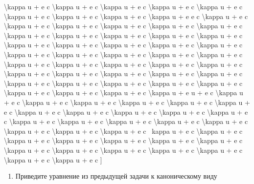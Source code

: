 \documentclass[
]{article}
\providecommand{\tightlist}{%
  \setlength{\itemsep}{0pt}\setlength{\parskip}{0pt}}
\begin{document}
{{\textbackslash kappa u + e c \textbackslash kappa u + e c
\textbackslash kappa u + e c \textbackslash kappa u + e c
\textbackslash kappa u + e c \textbackslash kappa u + e c
\textbackslash kappa u + e c \textbackslash kappa u + e c
\textbackslash kappa u + e e c \textbackslash kappa u + e c
\textbackslash kappa u + e c \textbackslash kappa u + e c
\textbackslash kappa u + e c \textbackslash kappa u + e c
\textbackslash kappa u + e c \textbackslash kappa u + e c
\textbackslash kappa u + e c \textbackslash kappa u + e c
\textbackslash kappa u + e c \textbackslash kappa u + e c
\textbackslash kappa u + e c \textbackslash kappa u + e c
\textbackslash kappa u + e c \textbackslash kappa u + e c
\textbackslash kappa u + e c \textbackslash kappa u + e c
\textbackslash kappa u + e c \textbackslash kappa u + e c
\textbackslash kappa u + e c \textbackslash kappa u + e c
\textbackslash kappa u + e c \textbackslash kappa u + e c
\textbackslash kappa u + e c \textbackslash kappa u + e c
\textbackslash kappa u + e c \textbackslash kappa u + e c
\textbackslash kappa u + e c \textbackslash kappa u + e c
\textbackslash kappa u + e c \textbackslash kappa u + e c
\textbackslash kappa u + e c \textbackslash kappa u + e c
\textbackslash kappa u + e c \textbackslash kappa u + e c
\textbackslash kappa u + e c \textbackslash kappa u + e c
\textbackslash kappa u + e c \textbackslash kappa u + e c
\textbackslash kappa u + e u + e c \textbackslash kappa u + e c
\textbackslash kappa u + e c \textbackslash kappa u + e c
\textbackslash kappa u + e c \textbackslash kappa u + e c
\textbackslash kappa u + e c \textbackslash kappa u + e c
\textbackslash kappa u + e c \textbackslash kappa u + e c
\textbackslash kappa u + e c \textbackslash kappa u + e c
\textbackslash kappa u + e c \textbackslash kappa u + e c
\textbackslash kappa u + e c \textbackslash kappa u + e c
\textbackslash kappa u + e c \textbackslash kappa u + e c
\textbackslash kappa u + e c \textbackslash kappa u + e c ~kappa u + e c
\textbackslash kappa u + e c \textbackslash kappa u + e c
\textbackslash kappa u + e c \textbackslash kappa u + e c
\textbackslash kappa u + e c \textbackslash kappa u + e c
\textbackslash kappa u + e c \textbackslash kappa u + e c
\textbackslash kappa u + e c \textbackslash kappa u + e c
\textbackslash kappa u + e c \textbackslash kappa u + e c
\textbackslash kappa u + e c {]}

\begin{enumerate}
\def\labelenumi{\arabic{enumi}.}
\setcounter{enumi}{3}
\tightlist
\item
  Приведите уравнение из предыдущей задачи к каноническому виду
\end{enumerate}

}}
\end{document}
